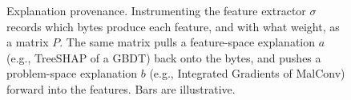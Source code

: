 \begin{figure}[t]
\caption{Explanation provenance. Instrumenting the feature extractor $\sigma$ records which bytes produce each feature,
and with what weight, as a matrix $P$. The same matrix pulls a feature-space explanation $a$ (e.g., TreeSHAP of a
GBDT) back onto the bytes, and pushes a problem-space explanation $b$ (e.g., Integrated Gradients of MalConv) forward
into the features. Bars are illustrative.}
\label{fig:overview}
\end{figure}
